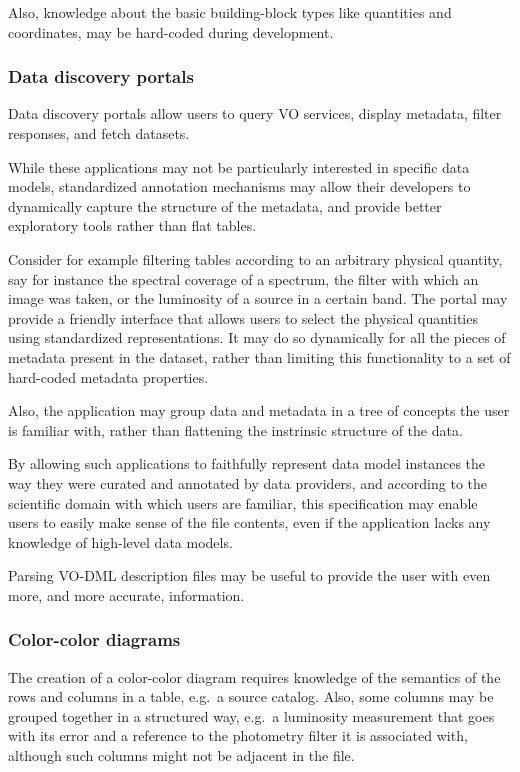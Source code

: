 \documentclass[11pt,a4paper]{ivoa}
\begin{document}
Also, knowledge about the basic building-block types like quantities and
coordinates, may be hard-coded during development.

\subsubsection{Data discovery portals}\label{data-discovery-portals}

Data discovery portals allow users to query VO services, display
metadata, filter responses, and fetch datasets.

While these applications may not be particularly interested in specific
data models, standardized annotation mechanisms may allow their
developers to dynamically capture the structure of the metadata, and
provide better exploratory tools rather than flat tables.

Consider for example filtering tables according to an arbitrary physical
quantity, say for instance the spectral coverage of a spectrum, the
filter with which an image was taken, or the luminosity of a source in a
certain band. The portal may provide a friendly interface that allows
users to select the physical quantities using standardized
representations. It may do so dynamically for all the pieces of metadata
present in the dataset, rather than limiting this functionality to a set
of hard-coded metadata properties.

Also, the application may group data and metadata in a tree of concepts
the user is familiar with, rather than flattening the instrinsic
structure of the data.

By allowing such applications to faithfully represent data model
instances the way they were curated and annotated by data providers, and
according to the scientific domain with which users are familiar, this
specification may enable users to easily make sense of the file
contents, even if the application lacks any knowledge of high-level data
models.

Parsing VO-DML description files may be useful to provide the user with
even more, and more accurate, information.

\subsubsection{Color-color diagrams}\label{color-color-diagrams}

The creation of a color-color diagram requires knowledge of the
semantics of the rows and columns in a table, e.g.~a source catalog.
Also, some columns may be grouped together in a structured way, e.g.~a
luminosity measurement that goes with its error and a reference to the
photometry filter it is associated with, although such columns might not
be adjacent in the file.
\end{document}
